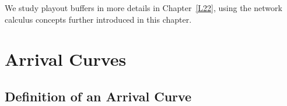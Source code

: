 %
%

We study playout buffers in more details in Chapter~\ref{L22},
using the network calculus concepts further introduced in this
chapter.



\section{Arrival Curves}

\subsection{Definition of an Arrival Curve}


